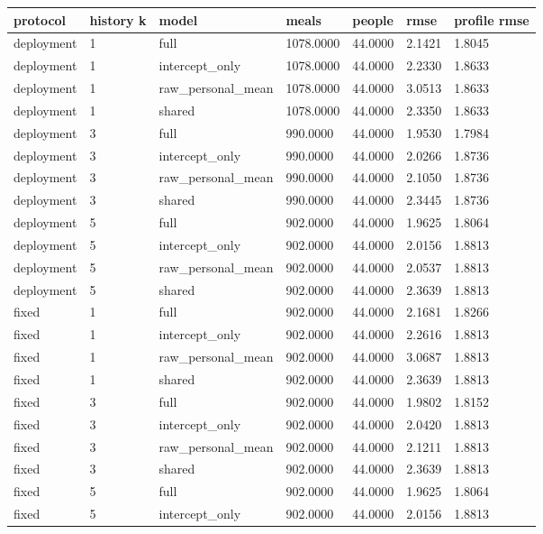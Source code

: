 {\footnotesize\setlength{\tabcolsep}{3pt}
\begin{longtable}{lllllll}
\toprule
\textbf{protocol} & \textbf{history k} & \textbf{model} & \textbf{meals} & \textbf{people} & \textbf{rmse} & \textbf{profile rmse} \\
\midrule
\endhead
deployment & 1 & full & 1078.0000 & 44.0000 & 2.1421 & 1.8045 \\
deployment & 1 & intercept\_only & 1078.0000 & 44.0000 & 2.2330 & 1.8633 \\
deployment & 1 & raw\_personal\_mean & 1078.0000 & 44.0000 & 3.0513 & 1.8633 \\
deployment & 1 & shared & 1078.0000 & 44.0000 & 2.3350 & 1.8633 \\
deployment & 3 & full & 990.0000 & 44.0000 & 1.9530 & 1.7984 \\
deployment & 3 & intercept\_only & 990.0000 & 44.0000 & 2.0266 & 1.8736 \\
deployment & 3 & raw\_personal\_mean & 990.0000 & 44.0000 & 2.1050 & 1.8736 \\
deployment & 3 & shared & 990.0000 & 44.0000 & 2.3445 & 1.8736 \\
deployment & 5 & full & 902.0000 & 44.0000 & 1.9625 & 1.8064 \\
deployment & 5 & intercept\_only & 902.0000 & 44.0000 & 2.0156 & 1.8813 \\
deployment & 5 & raw\_personal\_mean & 902.0000 & 44.0000 & 2.0537 & 1.8813 \\
deployment & 5 & shared & 902.0000 & 44.0000 & 2.3639 & 1.8813 \\
fixed & 1 & full & 902.0000 & 44.0000 & 2.1681 & 1.8266 \\
fixed & 1 & intercept\_only & 902.0000 & 44.0000 & 2.2616 & 1.8813 \\
fixed & 1 & raw\_personal\_mean & 902.0000 & 44.0000 & 3.0687 & 1.8813 \\
fixed & 1 & shared & 902.0000 & 44.0000 & 2.3639 & 1.8813 \\
fixed & 3 & full & 902.0000 & 44.0000 & 1.9802 & 1.8152 \\
fixed & 3 & intercept\_only & 902.0000 & 44.0000 & 2.0420 & 1.8813 \\
fixed & 3 & raw\_personal\_mean & 902.0000 & 44.0000 & 2.1211 & 1.8813 \\
fixed & 3 & shared & 902.0000 & 44.0000 & 2.3639 & 1.8813 \\
fixed & 5 & full & 902.0000 & 44.0000 & 1.9625 & 1.8064 \\
fixed & 5 & intercept\_only & 902.0000 & 44.0000 & 2.0156 & 1.8813 \\

\end{longtable}}
